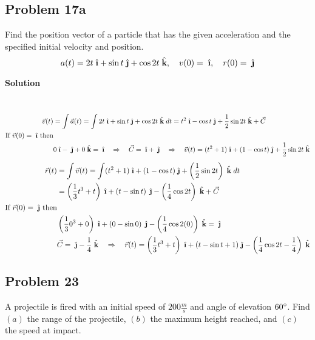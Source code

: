 \documentclass{article}
\newcommand{\ihat}{\;\hat{\textbf{\i}}}
\newcommand{\jhat}{\;\hat{\textbf{\j}}}
\newcommand{\khat}{\;\hat{\textbf{k}}}
\newcommand\vc[2]{\vec{#1}(#2)}
\newcommand\rr{\quad\Rightarrow\quad}
\begin{document}
\subsection*{Problem 17a}

Find the position vector of a particle that has the given acceleration and the specified initial velocity and position.
\[
    a(t) = 2t\ihat + \sin t\jhat + \cos 2t\khat, \quad v(0) = \ihat, \quad r(0) = \jhat
\]
\centerline{\textbf{Solution}} \\
\begin{align*}
    \vc v t &= \int \vc a t = \int 2t\ihat + \sin t\jhat + \cos 2t\khat \;dt = t^2\ihat -\cos t\jhat + \frac 1 2\sin 2t\khat + \vec C \\
    \text{If $\vc v 0 = \ihat$ then} \\
            &0\ihat - \jhat + 0\khat = \ihat \rr \vec C = \ihat + \jhat \rr \vc v t = (t^2 + 1)\ihat + (1 - \cos t)\jhat + \frac 1 2\sin 2t \khat \\
\end{align*}
\begin{align*}
    \vc r t &= \int \vc v t = \int (t^2 + 1)\ihat + (1 - \cos t)\jhat + \left( \frac 1 2 \sin 2t \right)\khat\;dt \\
            &= \left(\frac 1 3 t^3 + t\right)\ihat + \left(t -\sin t\right)\jhat - \left(\frac 1 4 \cos 2t\right)\khat + \vec C \\
            \text{If $\vc r 0 = \jhat$ then} \\
            &  \left(\frac 1 3 0^3 + 0\right)\ihat + \left(0 -\sin 0\right)\jhat - \left(\frac 1 4 \cos 2(0)\right)\khat = \jhat \\
            &\vec C = \jhat - \frac 1 4 \khat \rr \vc r t = \left(\frac 1 3 t^3 + t\right)\ihat + (t - \sin t + 1)\jhat - \left(\frac 1 4 \cos 2t - \frac 1 4\right)\khat
\end{align*}
\subsection*{Problem 23}

A projectile is fired with an initial speed of $200\frac m s$ and angle of elevation $60 \degree$. Find $(a)$ the range of the projectile, $(b)$ the maximum height reached, and $(c)$ the speed at impact.
\end{document}
